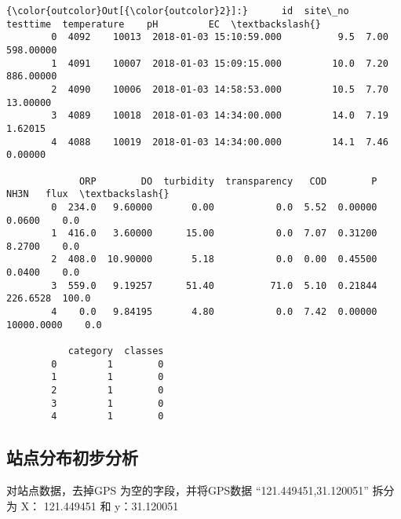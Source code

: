 \documentclass[11pt]{article}
\begin{document}
\begin{Verbatim}[commandchars=\\\{\}]
{\color{outcolor}Out[{\color{outcolor}2}]:}      id  site\_no                 testtime  temperature    pH         EC  \textbackslash{}
        0  4092    10013  2018-01-03 15:10:59.000          9.5  7.00  598.00000   
        1  4091    10007  2018-01-03 15:09:15.000         10.0  7.20  886.00000   
        2  4090    10006  2018-01-03 14:58:53.000         10.5  7.70   13.00000   
        3  4089    10018  2018-01-03 14:34:00.000         14.0  7.19    1.62015   
        4  4088    10019  2018-01-03 14:34:00.000         14.1  7.46    0.00000   
        
             ORP        DO  turbidity  transparency   COD        P        NH3N   flux  \textbackslash{}
        0  234.0   9.60000       0.00           0.0  5.52  0.00000      0.0600    0.0   
        1  416.0   3.60000      15.00           0.0  7.07  0.31200      8.2700    0.0   
        2  408.0  10.90000       5.18           0.0  0.00  0.45500      0.0400    0.0   
        3  559.0   9.19257      51.40          71.0  5.10  0.21844    226.6528  100.0   
        4    0.0   9.84195       4.80           0.0  7.42  0.00000  10000.0000    0.0   
        
           category  classes  
        0         1        0  
        1         1        0  
        2         1        0  
        3         1        0  
        4         1        0  
\end{Verbatim}
            
    \subsection{站点分布初步分析}\label{ux7ad9ux70b9ux5206ux5e03ux521dux6b65ux5206ux6790}

对站点数据，去掉GPS 为空的字段，并将GPS数据 ``121.449451,31.120051''
拆分为 X： 121.449451 和 y：31.120051
\end{document}
